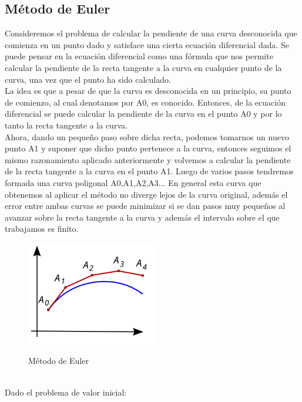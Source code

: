 \documentclass[12pt,a4paper]{article}
\begin{document}
    \subsection{Método de Euler}
    Consideremos el problema de calcular la pendiente de una curva desconocida que comienza en un punto dado y satisface una cierta ecuación diferencial dada. Se puede pensar en la ecuación diferencial como una fórmula que nos permite calcular la pendiente de la recta tangente a la curva en cualquier punto de la curva, una vez que el punto ha sido calculado.\\
    \hspace*{0.6cm}La idea es que a pesar de que la curva es desconocida en un principio, su punto de comienzo, al cual denotamos por A0, es conocido. Entonces, de la ecuación diferencial se puede calcular la pendiente de la curva en el punto A0 y por lo tanto la recta tangente a la curva.\\
    \hspace*{0.6cm}Ahora, dando un pequeño paso sobre dicha recta, podemos tomarnos un nuevo punto A1 y suponer que dicho punto pertenece a la curva, entonces seguimos el mismo razonamiento aplicado anteriormente y volvemos a calcular la pendiente de la recta tangente a la curva en el punto A1. Luego de varios pasos tendremos formada una curva poligonal A0,A1,A2,A3... En general esta curva que obtenemos al aplicar el método no diverge lejos de la curva original, además el error entre ambas curvas se puede minimizar si se dan pasos muy pequeños al avanzar sobre la recta tangente a la curva y además el intervalo sobre el que trabajamos es finito.\\
    \vspace{1cm}
    \begin{figure}[h]
        \centering
        \includegraphics{Euler_method.png}
        \label{Método de Euler}
        \caption{Método de Euler}
    \end{figure}\\
    \vspace{1cm}  
    Dado el problema de valor inicial:\\
\end{document}
